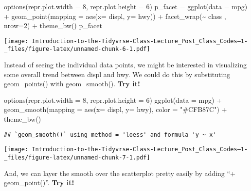 \documentclass[
]{article}
\newenvironment{Shaded}{\begin{snugshade}}{\end{snugshade}}
\newcommand{\AttributeTok}[1]{\textcolor[rgb]{0.77,0.63,0.00}{#1}}
\newcommand{\DecValTok}[1]{\textcolor[rgb]{0.00,0.00,0.81}{#1}}
\newcommand{\FunctionTok}[1]{\textcolor[rgb]{0.00,0.00,0.00}{#1}}
\newcommand{\NormalTok}[1]{#1}
\newcommand{\OtherTok}[1]{\textcolor[rgb]{0.56,0.35,0.01}{#1}}
\newcommand{\SpecialCharTok}[1]{\textcolor[rgb]{0.00,0.00,0.00}{#1}}
\newcommand{\StringTok}[1]{\textcolor[rgb]{0.31,0.60,0.02}{#1}}
\begin{document}
\begin{Shaded}
\begin{Highlighting}[]
\FunctionTok{options}\NormalTok{(}\AttributeTok{repr.plot.width =} \DecValTok{8}\NormalTok{, }\AttributeTok{repr.plot.height =} \DecValTok{6}\NormalTok{)}
\NormalTok{p\_facet }\OtherTok{=} \FunctionTok{ggplot}\NormalTok{(}\AttributeTok{data =}\NormalTok{ mpg) }\SpecialCharTok{+} 
  \FunctionTok{geom\_point}\NormalTok{(}\AttributeTok{mapping =} \FunctionTok{aes}\NormalTok{(}\AttributeTok{x=}\NormalTok{ displ, }\AttributeTok{y=}\NormalTok{ hwy)) }\SpecialCharTok{+} 
  \FunctionTok{facet\_wrap}\NormalTok{(}\SpecialCharTok{\textasciitilde{}}\NormalTok{ class , }\AttributeTok{nrow=}\DecValTok{2}\NormalTok{) }\SpecialCharTok{+} 
  \FunctionTok{theme\_bw}\NormalTok{()}
\NormalTok{p\_facet}
\end{Highlighting}
\end{Shaded}

\texttt{[image: Introduction-to-the-Tidyvrse-Class-Lecture\_Post\_Class\_Codes--1-\_files/figure-latex/unnamed-chunk-6-1.pdf]}

Instead of seeing the individual data points, we might be interested in
visualizing some overall trend between displ and hwy. We could do this
by substituting geom\_points() with geom\_smooth(). \textbf{Try it!}

\begin{Shaded}
\begin{Highlighting}[]
\FunctionTok{options}\NormalTok{(}\AttributeTok{repr.plot.width =} \DecValTok{8}\NormalTok{, }\AttributeTok{repr.plot.height =} \DecValTok{6}\NormalTok{)}
\FunctionTok{ggplot}\NormalTok{(}\AttributeTok{data =}\NormalTok{ mpg) }\SpecialCharTok{+} 
  \FunctionTok{geom\_smooth}\NormalTok{(}\AttributeTok{mapping =} \FunctionTok{aes}\NormalTok{(}\AttributeTok{x=}\NormalTok{ displ, }\AttributeTok{y=}\NormalTok{ hwy), }\AttributeTok{color =} \StringTok{"\#CFB87C"}\NormalTok{) }\SpecialCharTok{+}
  \FunctionTok{theme\_bw}\NormalTok{()}
\end{Highlighting}
\end{Shaded}

\begin{verbatim}
## `geom_smooth()` using method = 'loess' and formula 'y ~ x'
\end{verbatim}

\texttt{[image: Introduction-to-the-Tidyvrse-Class-Lecture\_Post\_Class\_Codes--1-\_files/figure-latex/unnamed-chunk-7-1.pdf]}

And, we can layer the smooth over the scatterplot pretty easily by
adding ``+ geom\_point()''. \textbf{Try it!}
\end{document}
